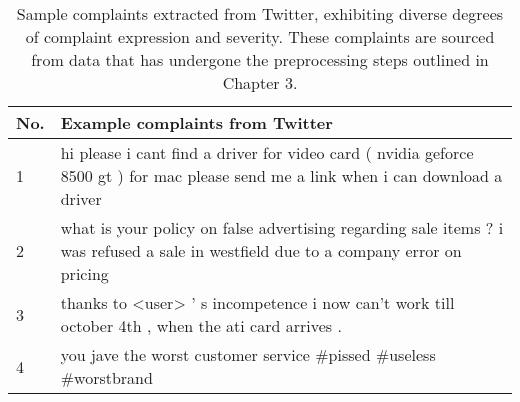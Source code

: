 \begin{table}[ht]
    \captionsetup{font=small}
    \centering
    \begin{tabularx}{\textwidth}{|l|X|}
        \hline
        \rowcolor[gray]{0.7}
        \textbf{No.} & \textbf{Example complaints from Twitter}                                                                                            \\
        \hline
        1            & hi please i cant find a driver for video card ( nvidia geforce 8500 gt ) for mac please send me a link when i can download a driver \\
        \hline
        2            & what is your policy on false advertising regarding sale items ? i was refused a sale in westfield due to a company error on pricing \\
        \hline
        3            & thanks to <user> ' s incompetence i now can't work till october 4th , when the ati card arrives .                                   \\
        \hline
        4            & you jave the worst customer service \! \! \! \#pissed \#useless \#worstbrand                                                        \\
        \hline
    \end{tabularx}
    \caption{Sample complaints extracted from Twitter, exhibiting diverse degrees of complaint expression and severity. These complaints are sourced from data that has undergone the preprocessing steps outlined in Chapter 3.}
    \label{tab: ex_complaints}
\end{table}

